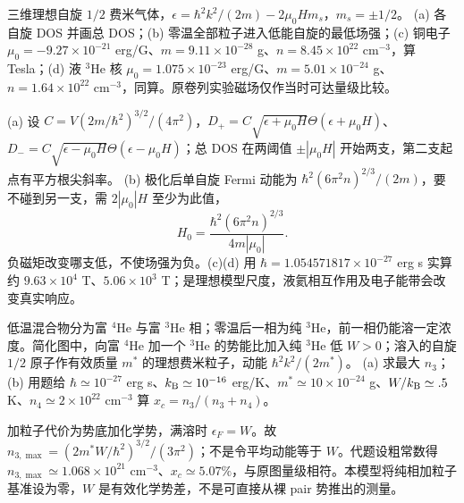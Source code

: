 \begin{exercise}
三维理想自旋 $1/2$ 费米气体，$\epsilon=\hbar^2k^2/(2m)-2\mu_0Hm_s$，$m_s=\pm1/2$。
(a) 各自旋 DOS 并画总 DOS；(b) 零温全部粒子进入低能自旋的最低场强；(c) 铜电子 $\mu_0=-9.27\times10^{-21}$ erg/G、$m=9.11\times10^{-28}$ g、$n=8.45\times10^{22}$ cm$^{-3}$，算 Tesla；(d) 液 $^3$He 核 $\mu_0=1.075\times10^{-23}$ erg/G、$m=5.01\times10^{-24}$ g、$n=1.64\times10^{22}$ cm$^{-3}$，同算。原卷列实验磁场仅作当时可达量级比较。
\end{exercise}
\begin{solution}
(a) 设 $C=V(2m/\hbar^2)^{3/2}/(4\pi^2)$，$D_+=C\sqrt{\epsilon+\mu_0H}\Theta(\epsilon+\mu_0H)$、$D_-=C\sqrt{\epsilon-\mu_0H}\Theta(\epsilon-\mu_0H)$；总 DOS 在两阈值 $\pm|\mu_0H|$ 开始两支，第二支起点有平方根尖斜率。
(b) 极化后单自旋 Fermi 动能为 $\hbar^2(6\pi^2n)^{2/3}/(2m)$，要不碰到另一支，需 $2|\mu_0|H$ 至少为此值，
\[H_0=\frac{\hbar^2(6\pi^2n)^{2/3}}{4m|\mu_0|}.\]
负磁矩改变哪支低，不使场强为负。(c)(d) 用 $\hbar=1.054571817\times10^{-27}$ erg s 实算约 $9.63\times10^4$ T、$5.06\times10^3$ T；是理想模型尺度，液氦相互作用及电子能带会改变真实响应。
\end{solution}
\begin{center}\end{center}
\begin{exercise}
低温混合物分为富 $^4$He 与富 $^3$He 相；零温后一相为纯 $^3$He，前一相仍能溶一定浓度。简化图中，向富 $^4$He 加一个 $^3$He 的势能比加入纯 $^3$He 低 $W>0$；溶入的自旋 $1/2$ 原子作有效质量 $m^*$ 的理想费米粒子，动能 $\hbar^2k^2/(2m^*)$。
(a) 求最大 $n_3$；(b) 用题给 $\hbar\simeq10^{-27}$ erg s、$k_{\mathrm B}\simeq10^{-16}$ erg/K、$m^*\simeq10\times10^{-24}$ g、$W/k_{\mathrm B}\simeq.5$ K、$n_4\simeq2\times10^{22}$ cm$^{-3}$ 算 $x_c=n_3/(n_3+n_4)$。
\end{exercise}
\begin{solution}
加粒子代价为势底加化学势，满溶时 $\epsilon_F=W$。故 $n_{3,\max}=(2m^*W/\hbar^2)^{3/2}/(3\pi^2)$；不是令平均动能等于 $W$。代题设粗常数得 $n_{3,\max}\simeq1.068\times10^{21}$ cm$^{-3}$、$x_c\simeq5.07\%$，与原图量级相符。本模型将纯相加粒子基准设为零，$W$ 是有效化学势差，不是可直接从裸 pair 势推出的测量。
\end{solution}
